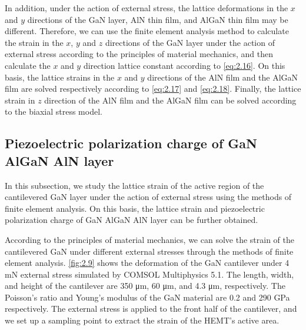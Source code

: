 \noindent In addition, under the action of external stress, the lattice deformations  in the $x$ and $y$ directions of the GaN layer, AlN thin film, and AlGaN thin film  may be different. Therefore, we can use the finite element analysis  method to calculate the  strain in the $x$, $y$ and $z$ directions of the GaN layer under the action of external stress according to the principles of material mechanics, and then calculate the $x$ and $y$ direction lattice constant  according to \autoref{eq:2.16}. On this basis, the lattice strains  in the $x$ and $y$ directions of the AlN film and the AlGaN film are solved respectively according to \autoref{eq:2.17} and \autoref{eq:2.18}. Finally, the lattice strain  in $z$ direction of the AlN film and the AlGaN film can be solved according to the biaxial  stress model.

\subsection{Piezoelectric polarization charge of GaN AlGaN AlN layer}
\label{sec:Piezoelectric polarization charge of GaN AlGaN AlN layer}

In this subsection, we study the lattice strain  of the active region  of the  cantilevered GaN layer under the action of external stress using the methods of finite element  analysis. On this basis, the lattice strain and piezoelectric polarization charge  of GaN AlGaN AlN layer can be further obtained.

 According to the principles of material mechanics, we can solve the strain  of the cantilevered GaN under different external stresses through the methods of finite element analysis. \autoref{fig:2.9} shows the deformation  of the GaN cantilever under 4 \unit{\mN} external stress simulated by COMSOL Multiphysics 5.1. The length, width, and height of the cantilever are 350 \unit{\um}, 60 \unit{\um}, and 4.3 \unit{\um}, respectively. The Poisson's ratio  and Young's modulus  of the GaN material are 0.2 \cite{qin2017mechanical} and 290 \unit{GPa} \cite{ben2014young,nowak1999elastic} respectively. The external stress is applied to the front half of the  cantilever, and we set up a sampling point to extract the strain of the HEMT's active area.

